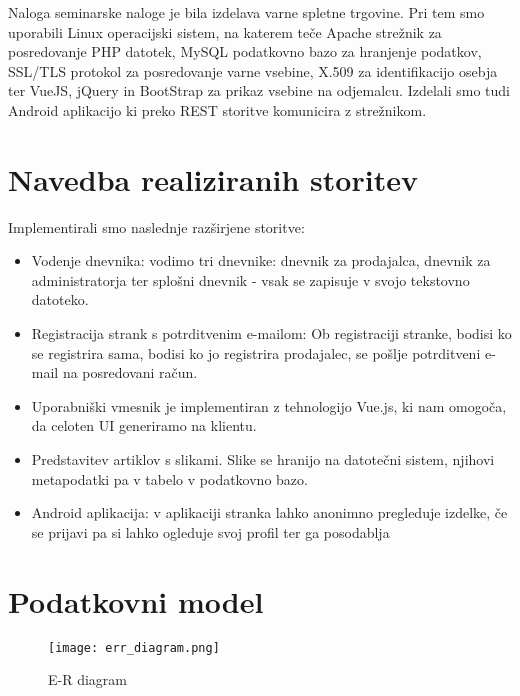 \documentclass[a4paper,12pt]{report}
\begin{document}
Naloga seminarske naloge je bila izdelava varne spletne trgovine. Pri tem smo uporabili Linux operacijski sistem, na katerem teče Apache strežnik za posredovanje PHP datotek, MySQL podatkovno bazo za hranjenje podatkov, SSL/TLS protokol za posredovanje varne vsebine, X.509 za identifikacijo osebja ter VueJS, jQuery in BootStrap za prikaz vsebine na odjemalcu. Izdelali smo tudi Android aplikacijo ki preko REST storitve komunicira z strežnikom.


\chapter{Navedba realiziranih storitev}

Implementirali smo naslednje razširjene storitve:

\begin{itemize}  
\item Vodenje dnevnika: vodimo tri dnevnike: dnevnik za prodajalca, dnevnik za administratorja ter splošni dnevnik - vsak se zapisuje v svojo tekstovno datoteko.
\item Registracija strank s potrditvenim e-mailom: Ob registraciji stranke, bodisi ko se registrira sama, bodisi ko jo registrira prodajalec, se pošlje potrditveni e-mail na posredovani račun.
\item Uporabniški vmesnik je implementiran z tehnologijo Vue.js, ki nam omogoča, da celoten UI generiramo na klientu.
\item Predstavitev artiklov s slikami. Slike se hranijo na datotečni sistem, njihovi metapodatki pa v tabelo v podatkovno bazo.
\item Android aplikacija: v aplikaciji stranka lahko anonimno pregleduje izdelke, če se prijavi pa si lahko ogleduje svoj profil ter ga posodablja
\end{itemize}



\chapter{Podatkovni model}

\begin{figure}[htbp]
\begin{center}
\texttt{[image: err\_diagram.png]}
\caption{E-R diagram}
\label{Tekstovni dendrogram}
\end{center}
\end{figure}
\end{document}

